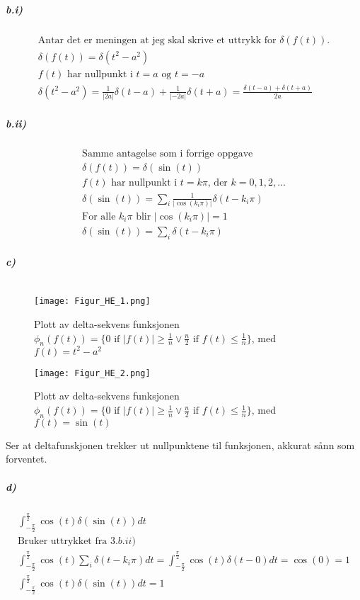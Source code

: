 \documentclass[11pt, A4paper,norsk]{article}
\begin{document}
			\subparagraph{b.i)}
				\begin{gather*}
\text{Antar det er meningen at jeg skal skrive et uttrykk for $\delta(f(t))$.} \\
\delta(f(t)) = \delta(t^2 - a^2) \\
\text{$f(t)$ har nullpunkt i $t = a$ og $t = - a$} \\
\delta(t^2 - a^2) = \frac{1}{|2a|} \delta(t - a) + \frac{1}{|- 2a|} \delta(t + a) = \frac{\delta(t - a) + \delta(t + a)}{2a}
				\end{gather*}












			\subparagraph{b.ii)}
				\begin{gather*}
\text{Samme antagelse som i forrige oppgave} \\
\delta(f(t)) = \delta(\sin(t)) \\
\text{$f(t)$ har nullpunkt i $t = k\pi$, der $k = 0, 1, 2, \dots$} \\
\delta(\sin(t)) = \sum_{i} \frac{1}{|\cos(k_i\pi)|} \delta(t - k_i\pi) \\
\text{For alle $k_i \pi$ blir $|\cos(k_i \pi)| = 1$} \\
\delta(\sin(t)) = \sum_{i} \delta(t - k_i\pi)
				\end{gather*}












\clearpage
			\subparagraph{c)} $ $
				\begin{figure}[H]
\texttt{[image: Figur\_HE\_1.png]}
\caption{Plott av delta-sekvens funksjonen $\phi_n(f(t)) = \{ 0 \text{ if } |f(t)| \geq \frac{1}{n} \vee \frac{n}{2} \text{ if } f(t) \leq \frac{1}{n} \}$, med $f(t) = t^2 - a^2$}
\texttt{[image: Figur\_HE\_2.png]}
\caption{Plott av delta-sekvens funksjonen $\phi_n(f(t)) = \{ 0 \text{ if } |f(t)| \geq \frac{1}{n} \vee \frac{n}{2} \text{ if } f(t) \leq \frac{1}{n} \}$, med $f(t) = \sin(t)$}
				\end{figure}
				\begin{flushleft}
Ser at deltafunskjonen trekker ut nullpunktene til funksjonen, akkurat sånn som forventet.

				\end{flushleft}







			\subparagraph{d)}
				\begin{gather*}
\int_{- \frac{\pi}{2}}^{\frac{\pi}{2}} \cos(t) \delta(\sin(t)) dt \\
\text{Bruker uttrykket fra $3. b.ii)$} \\
\int_{- \frac{\pi}{2}}^{\frac{\pi}{2}} \cos(t) \sum_{i} \delta(t - k_i\pi) dt = \int_{- \frac{\pi}{2}}^{\frac{\pi}{2}} \cos(t) \delta(t - 0) dt = \cos(0) = 1 \\
\int_{- \frac{\pi}{2}}^{\frac{\pi}{2}} \cos(t) \delta(\sin(t)) dt = 1
				\end{gather*}
\end{document}
